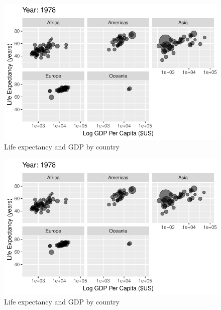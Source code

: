 \documentclass[
  letterpaper,
  DIV=11,
  numbers=noendperiod]{scrreport}
\theoremstyle{definition}
\theoremstyle{remark}
\begin{document}
\begin{figure}

{\centering \includegraphics{index_files/figure-pdf/fig-anim-lifegdp-47.pdf}

}

\caption{\label{fig-anim-lifegdp-47}Life expectancy and GDP by country}

\end{figure}

\begin{figure}

{\centering \includegraphics{index_files/figure-pdf/fig-anim-lifegdp-48.pdf}

}

\caption{\label{fig-anim-lifegdp-48}Life expectancy and GDP by country}

\end{figure}
\end{document}
